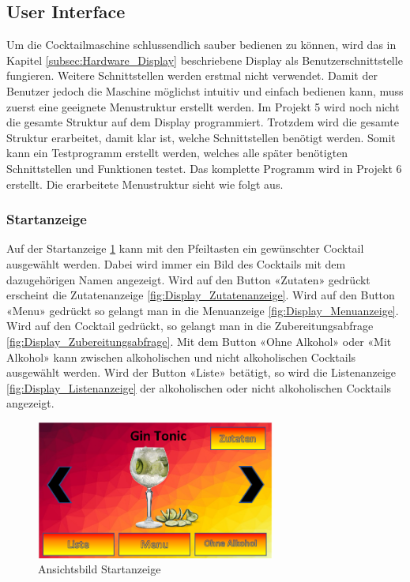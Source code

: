 \subsection{User Interface}\label{subsubsec:Detailkonzept_UserInterface}

Um die Cocktailmaschine schlussendlich sauber bedienen zu können, wird das in Kapitel \ref{subsec:Hardware_Display} beschriebene Display als Benutzerschnittstelle fungieren. Weitere Schnittstellen werden erstmal nicht verwendet. Damit der Benutzer jedoch die Maschine möglichst intuitiv und einfach bedienen kann, muss zuerst eine geeignete Menustruktur erstellt werden. Im Projekt 5 wird noch nicht die gesamte Struktur auf dem Display programmiert. Trotzdem wird die gesamte Struktur erarbeitet, damit klar ist, welche Schnittstellen benötigt werden. Somit kann ein Testprogramm erstellt werden, welches alle später benötigten Schnittstellen und Funktionen testet. Das komplette Programm wird in Projekt 6 erstellt. Die erarbeitete Menustruktur sieht wie folgt aus.

\subsubsection{Startanzeige}\label{subsubsec:Display_Startanzeige}

Auf der Startanzeige \ref{fig:Display_Startanzeige} kann mit den Pfeiltasten ein gewünschter Cocktail ausgewählt werden. Dabei wird immer ein Bild des Cocktails mit dem dazugehörigen Namen angezeigt. Wird auf den Button «Zutaten» gedrückt erscheint die Zutatenanzeige \ref{fig:Display_Zutatenanzeige}. Wird auf den Button «Menu» gedrückt so gelangt man in die Menuanzeige \ref{fig:Display_Menuanzeige}. Wird auf den Cocktail gedrückt, so gelangt man in die Zubereitungsabfrage \ref{fig:Display_Zubereitungsabfrage}. Mit dem Button «Ohne Alkohol» oder «Mit Alkohol» kann zwischen alkoholischen und nicht alkoholischen Cocktails ausgewählt werden. Wird der Button «Liste» betätigt, so wird die Listenanzeige \ref{fig:Display_Listenanzeige} der alkoholischen oder nicht alkoholischen Cocktails angezeigt.

\begin{figure}[h!]
\centering
\includegraphics[width=0.7\textwidth]{graphics/Display_Startanzeige.png}
\caption{Ansichtsbild Startanzeige}
\label{fig:Display_Startanzeige}
\end{figure}

